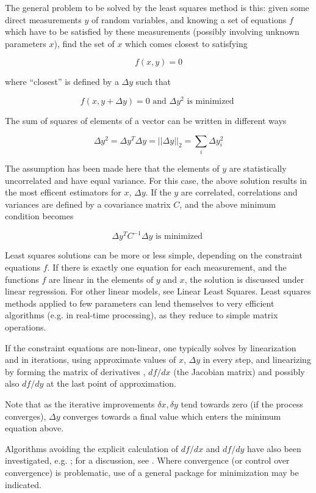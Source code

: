 \documentclass{article}
\begin{document}
The general problem to be solved by the least squares method is this: given some direct measurements $y$ of random variables, and knowing a set of equations $f$ which have to be satisfied by these measurements (possibly involving unknown parameters $x$), find the set of $x$ which comes closest to satisfying

$$ f(x,y) = 0 $$

where ``closest'' is defined by a $\Delta y$ such that

$$ f(x,y+\Delta y)=0 \text{ and } \Delta y^2 \text{ is minimized } $$

The sum of squares of elements of a vector can be written in different ways

$$ \Delta y^2 = \Delta y^T \Delta y = ||\Delta y||_2 = \sum_i \Delta y_i^2 $$

The assumption has been made here that the elements of $y$ are statistically uncorrelated and have equal variance. For this case, the above solution results in the most efficent estimators for $x$, $\Delta y$. If the $y$ are correlated, correlations and variances are defined by a covariance matrix $C$, and the above minimum condition becomes

$$ \Delta y^T C^{-1} \Delta y \text{ is minimized } $$

Least squares solutions can be more or less simple, depending on the constraint equations $f$. If there is exactly one equation for each measurement, and the functions $f$ are linear in the elements of $y$ and $x$, the solution is discussed under linear regression. For other linear models, see Linear Least Squares. Least squares methods applied to few parameters can lend themselves to very efficient algorithms (e.g. in real-time  processing), as they reduce to simple matrix operations.

If the constraint equations are non-linear, one typically solves by linearization and in iterations, using approximate values of $x$, $\Delta y$ in every step, and linearizing by forming the matrix of derivatives , $df/dx$ (the Jacobian matrix) and possibly also $df/dy$ at the last point of approximation. 

Note that as the iterative improvements $\delta x, \delta y$ tend towards zero (if the process converges), $\Delta y$ converges towards a final value which enters the minimum equation above.

Algorithms avoiding the explicit calculation of $df/dx$ and $df/dy$ have also been investigated, e.g. \cite{Ralston78b}; for a discussion, see \cite{Press95}. Where convergence (or control over convergence) is problematic, use of a general package for minimization may be indicated.
\end{document}
